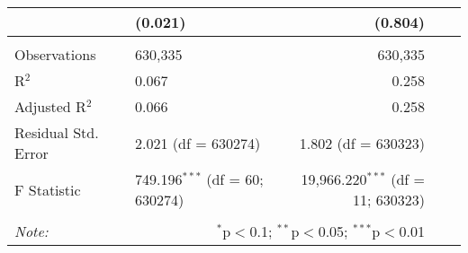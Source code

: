 \begin{longtable}{ll|rrr}
        & (0.021) & (0.804) \\ 
        \hline \\[-4ex] 
        Observations & 630,335 & 630,335 \\ 
        R$^{2}$ & 0.067 & 0.258 \\ 
        Adjusted R$^{2}$ & 0.066 & 0.258 \\ 
        Residual Std. Error & 2.021 (df = 630274) & 1.802 (df = 630323) \\ 
        F Statistic & 749.196$^{***}$ (df = 60; 630274) & 19,966.220$^{***}$ (df = 11; 630323) \\ 
    \hline 
    \hline \\[-4ex] 
    \textit{Note:}  & \multicolumn{2}{r}{$^{*}$p$<$0.1; $^{**}$p$<$0.05; $^{***}$p$<$0.01} \\ 
    \end{longtable}
    \endgroup
\newpage
